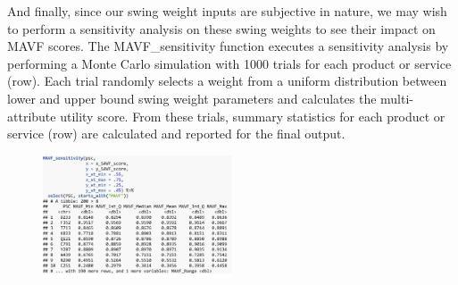 \documentclass[twocolumn]{svjour3}       %
\begin{document}
And finally, since our swing weight inputs are subjective in nature, we may wish to perform a sensitivity analysis on these swing weights to see their impact on MAVF scores. The MAVF\_sensitivity function executes a sensitivity analysis by performing a Monte Carlo simulation with 1000 trials for each product or service (row). Each trial randomly selects a weight from a uniform distribution between lower and upper bound swing weight parameters and calculates the multi-attribute utility score. From these trials, summary statistics for each product or service (row) are calculated and reported for the final output. 
\begin{figure}[!htb]
  \includegraphics[width=0.5\textwidth]{code13.png}
\end{figure}
\end{document}
